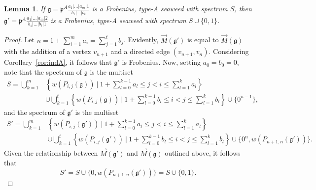 \documentclass[letterpaper,10pt]{article}
\newtheorem{lemma}[theorem]{Lemma}
\begin{document}
\begin{lemma}\label{lem:add2s}
If $\mathfrak{g}=\mathfrak{p}^A\frac{a_1|\hdots|a_m|1}{b_1|\hdots|b_t}$ is a Frobenius, type-A seaweed with spectrum $S$, then $\mathfrak{g}'=\mathfrak{p}^A\frac{a_1|\hdots|a_m|2}{b_1|\hdots|b_t|1}$ is a Frobenius, type-A seaweed with spectrum $S\cup\{0,1\}$.
\end{lemma}
\begin{proof}
Let $n=1+\sum_{i=1}^ma_i=\sum_{j=1}^tb_j$. Evidently, $\overrightarrow{M}(\mathfrak{g}')$ is equal to $\overrightarrow{M}(\mathfrak{g})$ with the addition of a vertex $v_{n+1}$ and a directed edge $(v_{n+1},v_n)$. Considering Corollary~\ref{cor:indA}, it follows that $\mathfrak{g}'$ is Frobenius. Now, setting $a_0=b_0=0$, note that the spectrum of $\mathfrak{g}$ is the multiset \begin{align*}
S=\bigcup_{k=1}^m&\left\{w(P_{i,j}(\mathfrak{g}))~|~1+\sum_{l=0}^{k-1}a_{l}\le j< i\le \sum_{l=1}^ka_l\right\} \\
    &\cup \bigcup_{k=1}^t\left\{w(P_{i,j}(\mathfrak{g}))~|~1+\sum_{l=0}^{k-1}b_{l}\le i< j\le \sum_{l=1}^kb_l\right\} \cup\{0^{n-1}\},
    \end{align*}
    and the spectrum of $\mathfrak{g}'$ is the multiset
\begin{align*}
    S'=\bigcup_{k=1}^m&\left\{w(P_{i,j}(\mathfrak{g}'))~|~1+\sum_{l=0}^{k-1}a_{l}\le j< i\le \sum_{l=1}^ka_l\right\} \\
    &\cup \bigcup_{k=1}^t\left\{w(P_{i,j}(\mathfrak{g}'))~|~1+\sum_{l=0}^{k-1}b_{l}\le i< j\le \sum_{l=1}^kb_l\right\} \cup\{0^{n},w(P_{n+1,n}(\mathfrak{g}'))\}.
\end{align*}
Given the relationship between $\overrightarrow{M}(\mathfrak{g}')$ and $\overrightarrow{M}(\mathfrak{g})$  outlined above, it follows that 
$$S'=S\cup\{0,w(P_{n+1,n}(\mathfrak{g}'))\}=S\cup\{0,1\}.$$
\end{proof}
\end{document}
